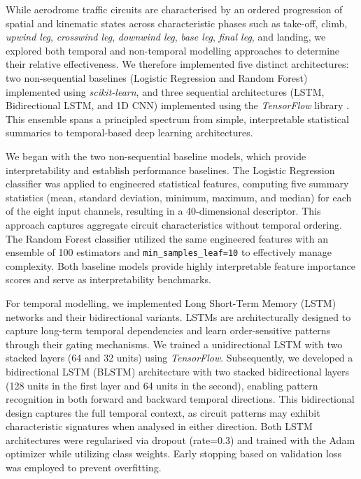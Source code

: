 \documentclass[
  manuscript=proceedings,  %
  layout=preprint,         %
  year=2025,
  volume=x,
]{extra/joas}
\begin{document}
While aerodrome traffic circuits are characterised by an ordered progression of spatial and kinematic states across characteristic phases such as take-off, climb, \textit{upwind leg}, \textit{crosswind leg}, \textit{downwind leg}, \textit{base leg}, \textit{final leg}, and landing, we explored both temporal and non-temporal modelling approaches to determine their relative effectiveness. We therefore implemented five distinct architectures: two non-sequential baselines (Logistic Regression and Random Forest) implemented using \textit{scikit-learn}, and three sequential architectures (LSTM, Bidirectional LSTM, and 1D CNN) implemented using the \textit{TensorFlow} library \cite{tensorflow2015-whitepaper}. This ensemble spans a principled spectrum from simple, interpretable statistical summaries to temporal-based deep learning architectures.

We began with the two non-sequential baseline models, which provide interpretability and establish performance baselines. The Logistic Regression classifier was applied to engineered statistical features, computing five summary statistics (mean, standard deviation, minimum, maximum, and median) for each of the eight input channels, resulting in a 40-dimensional descriptor. This approach captures aggregate circuit characteristics without temporal ordering. The Random Forest classifier utilized the same engineered features with an ensemble of 100 estimators and \texttt{min\_samples\_leaf=10} to effectively manage complexity. Both baseline models provide highly interpretable feature importance scores and serve as interpretability benchmarks.

For temporal modelling, we implemented Long Short-Term Memory (LSTM) networks and their bidirectional variants. LSTMs are architecturally designed to capture long-term temporal dependencies and learn order-sensitive patterns through their gating mechanisms. We trained a unidirectional LSTM with two stacked layers (64 and 32 units) using \textit{TensorFlow}. Subsequently, we developed a bidirectional LSTM (BLSTM) architecture with two stacked bidirectional layers (128 units in the first layer and 64 units in the second), enabling pattern recognition in both forward and backward temporal directions. This bidirectional design captures the full temporal context, as circuit patterns may exhibit characteristic signatures when analysed in either direction. Both LSTM architectures were regularised via dropout (rate=0.3) and trained with the Adam optimizer while utilizing class weights. Early stopping based on validation loss was employed to prevent overfitting.
\end{document}
